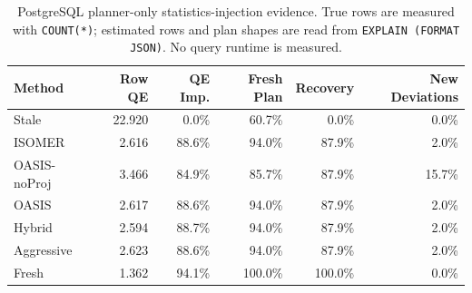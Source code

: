 \begin{table}[t]
  \centering
  \small
  \caption{PostgreSQL planner-only statistics-injection evidence. True rows are measured with \texttt{COUNT(*)}; estimated rows and plan shapes are read from \texttt{EXPLAIN (FORMAT JSON)}. No query runtime is measured.}
  \label{tab:postgres_planner_stats_injection}
  \setlength{\tabcolsep}{4pt}
  \begin{tabular}{lrrrrr}
    \toprule
    Method & Row QE & QE Imp. & Fresh Plan & Recovery & New Deviations \\
    \midrule
    Stale & 22.920 & 0.0\% & 60.7\% & 0.0\% & 0.0\% \\
    ISOMER & 2.616 & 88.6\% & 94.0\% & 87.9\% & 2.0\% \\
    OASIS-noProj & 3.466 & 84.9\% & 85.7\% & 87.9\% & 15.7\% \\
    OASIS & 2.617 & 88.6\% & 94.0\% & 87.9\% & 2.0\% \\
    Hybrid & 2.594 & 88.7\% & 94.0\% & 87.9\% & 2.0\% \\
    Aggressive & 2.623 & 88.6\% & 94.0\% & 87.9\% & 2.0\% \\
    Fresh & 1.362 & 94.1\% & 100.0\% & 100.0\% & 0.0\% \\
    \bottomrule
  \end{tabular}
\end{table}
